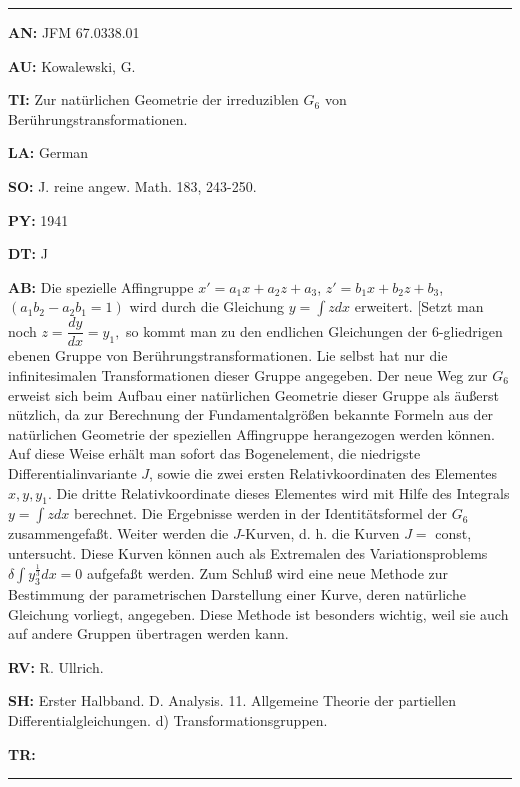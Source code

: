 \bigskip\par\noindent\hrule\bigskip\par

\item{\bf AN:} JFM 67.0338.01
\item{\bf AU:} Kowalewski, G.
\item{\bf TI:} Zur nat\"urlichen Geometrie der irreduziblen $G_6$ von
Ber\"uhrungstransformationen.
\item{\bf LA:} German
\item{\bf SO:} J. reine angew. Math. 183, 243-250.
\item{\bf PY:} 1941
\item{\bf DT:} J
\item{\bf AB:}{\parindent15pt
 Die spezielle Affingruppe $x' = a_1x +a_2z+a_3$,
$z' = b_1x + b_2z + b_3$,
$(a_1b_2 -a_2 b_1 = 1)$ wird durch die Gleichung
$y= \int zdx$ erweitert. [Setzt man
noch $z = \dfrac{dy}{dx}= y_1,$
so kommt man zu den endlichen Gleichungen der 6-gliedrigen
ebenen Gruppe von Ber\"uhrungstransformationen. Lie selbst hat nur die
infinitesimalen Transformationen
dieser Gruppe angegeben. Der neue Weg zur $G_6$ erweist
sich beim Aufbau einer nat\"urlichen Geometrie dieser Gruppe als \"au{\ss}erst
n\"utzlich,
da zur Berechnung der Fundamentalgr\"o{\ss}en bekannte Formeln aus der
nat\"urlichen
Geometrie der speziellen
Affingruppe herangezogen werden k\"onnen. Auf diese Weise
erh\"alt man sofort
das Bogenelement, die niedrigste Differentialinvariante $J$, sowie
die zwei ersten Relativkoordinaten des Elementes $x, y, y_1$. Die dritte
Relativkoordinate dieses
Elementes wird mit Hilfe des Integrals $y = \int zdx$ berechnet. Die
Ergebnisse werden in
der Identit\"atsformel der $G_6$ zusammengefa{\ss}t. Weiter werden
die
$J$-Kurven, d. h. die Kurven $J =$ const, untersucht. Diese Kurven k\"onnen auch als
Extremalen des Variationsproblems $\delta \int y^{\tfrac13}_3dx=0$
aufgefa{\ss}t werden. Zum
Schlu{\ss}
wird eine neue Methode
zur Bestimmung der parametrischen Darstellung einer Kurve,
deren nat\"urliche Gleichung
vorliegt, angegeben. Diese Methode ist besonders wichtig,
weil sie auch auf andere Gruppen \"ubertragen werden kann.
}
\item{\bf RV:} R. Ullrich.
\item{\bf SH:} Erster Halbband. D. Analysis. 11. Allgemeine Theorie der partiellen Differentialgleichungen.
d) Transformationsgruppen.
\item{\bf TR:}

\bigskip\par\noindent\hrule\bigskip\par

